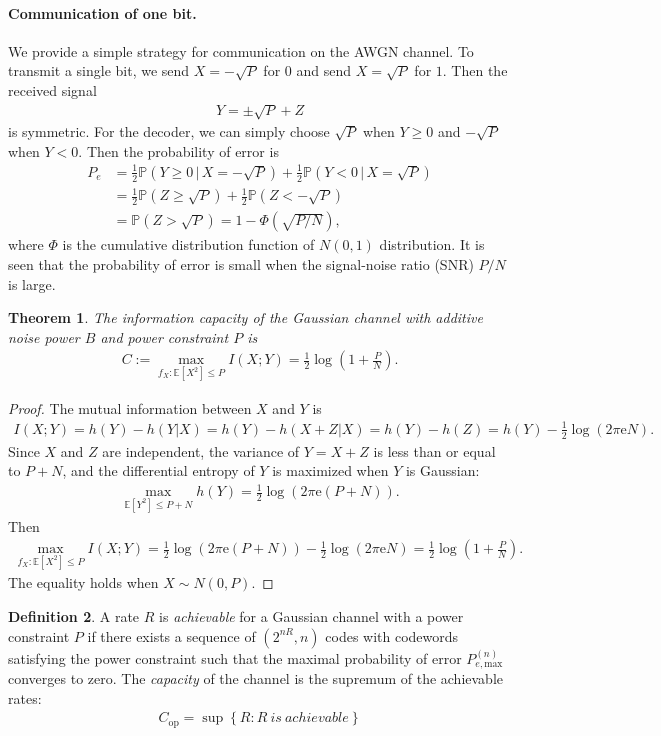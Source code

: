\documentclass{article}
\numberwithin{equation}{section}
\newcommand{\e}{\mathrm{e}}
\newcommand{\E}{\mathbb{E}}
\newcommand{\bbP}{\mathbb{P}}
\theoremstyle{plain}
\newtheorem{theorem}{Theorem}[section]
\theoremstyle{definition}
\newtheorem{definition}[theorem]{Definition}
\begin{document}
\paragraph{Communication of one bit.} We provide a simple strategy for communication on the AWGN channel. To transmit a single bit, we send $X=-\sqrt{P}$ for $0$ and send $X=\sqrt{P}$ for $1$. Then the received signal
\begin{align*}
	Y=\pm\sqrt{P}+Z
\end{align*}
is symmetric. For the decoder, we can simply choose $\sqrt{P}$ when $Y\geq 0$ and $-\sqrt{P}$ when $Y<0$. Then the probability of error is
\begin{align*}
	P_e&=\frac{1}{2}\bbP\left(Y\geq 0\,|\,X=-\sqrt{P}\right)+\frac{1}{2}\bbP\left(Y<0\,|\,X=\sqrt{P}\right)\\
	&=\frac{1}{2}\bbP\left(Z\geq\sqrt{P}\right)+\frac{1}{2}\bbP\left(Z<-\sqrt{P}\right)\\
	&=\bbP\left(Z>\sqrt{P}\right)=1-\Phi\left(\sqrt{P/N}\right),
\end{align*}
where $\Phi$ is the cumulative distribution function of $N(0,1)$ distribution. It is seen that the probability of error is small when the signal-noise ratio (SNR) $P/N$ is large.

\begin{theorem}
The \textit{information capacity} of the Gaussian channel with additive noise power $B$ and power constraint $P$ is
\begin{align*}
	C:=\max_{f_X:\E[X^2]\leq P} I(X;Y)=\frac{1}{2}\log\left(1+\frac{P}{N}\right).
\end{align*}
\end{theorem}

\begin{proof}
The mutual information between $X$ and $Y$ is
\begin{align*}
	I(X;Y)=h(Y)-h(Y|X)=h(Y)-h(X+Z|X)=h(Y)-h(Z)=h(Y)-\frac{1}{2}\log(2\pi\e N).
\end{align*}
Since $X$ and $Z$ are independent, the variance of $Y=X+Z$ is less than or equal to $P+N$, and the differential entropy of $Y$ is maximized when $Y$ is Gaussian:
\begin{align*}
	\max_{\E[Y^2]\leq P+N}h(Y)=\frac{1}{2}\log(2\pi\e(P+N)).
\end{align*}
Then
\begin{align*}
	\max_{f_X:\E[X^2]\leq P} I(X;Y)=\frac{1}{2}\log(2\pi\e(P+N))-\frac{1}{2}\log(2\pi\e N)=\frac{1}{2}\log\left(1+\frac{P}{N}\right).
\end{align*}
The equality holds when $X\sim N(0,P)$.
\end{proof}
\begin{definition}
	A rate $R$ is \textit{achievable} for a Gaussian channel
	with a power constraint $P$ if there exists a sequence of $(2^{nR},n)$ codes
	with codewords satisfying the power constraint such that the maximal
	probability of error $P_{e,\mathrm{max}}^{(n)}$ converges to zero. The \textit{capacity} of the channel is the supremum of the achievable rates:
	\begin{align*}
		C_{\mathrm{op}}=\sup\left\{R:R\ is\ achievable\right\}
	\end{align*}
\end{definition}
\end{document}

